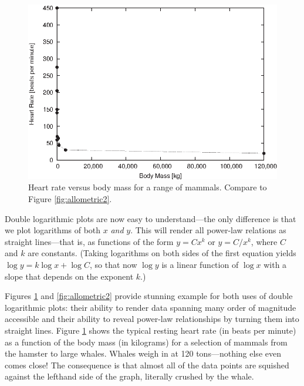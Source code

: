 \begin{figure}
  \centerline{\includegraphics{img/allometric1}}\vspace*{-3pt}
  \caption{Heart rate versus body mass for a range of mammals. Compare
    to Figure \ref{fig:allometric2}.}
  \label{fig:allometric1}\vspace*{-6pt} 
\end{figure}

Double logarithmic plots  are now easy to understand---the only
difference is that we plot logarithms of both $x$ \emph{and} $y$.
This will render all power-law relations as straight lines---that is,
as functions of the form $y = C x^k$ or $y = C/x^k$, where $C$ and $k$
are constants. (Taking logarithms on both sides of the first equation
yields $\log y = k \log x + \log C$, so that now $\log y$ is a linear
function of $\log x$ with a slope that depends on the exponent $k$.)

Figures \ref{fig:allometric1} and \ref{fig:allometric2} provide
stunning example for both uses of double logarithmic plots: their
ability to render data spanning many order of magnitude accessible and
their ability to reveal power-law relationships by turning them into
straight lines. Figure \ref{fig:allometric1} shows the typical resting
heart rate (in beats per minute) as a function of the body mass (in
kilograms) for a selection of mammals from the hamster to large 
whales. Whales weigh in at 120 tons---nothing else even comes close!
The consequence is that almost all of the data points are squished
against the lefthand side of the graph, literally crushed by the
whale.



